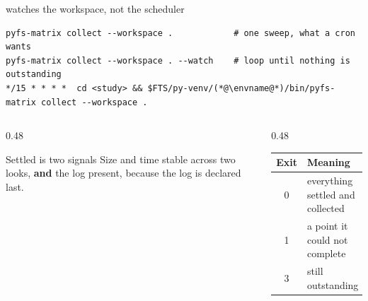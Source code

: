 \begin{frame}[fragile]{ watches the workspace, not the scheduler}
\begin{lstlisting}[style=ftsbase]
pyfs-matrix collect --workspace .            # one sweep, what a cron wants
pyfs-matrix collect --workspace . --watch    # loop until nothing is outstanding
*/15 * * * *  cd <study> && $FTS/py-venv/(*@\envname@*)/bin/pyfs-matrix collect --workspace .
\end{lstlisting}
\begin{columns}[T]
\begin{column}{0.48\textwidth}
\begin{block}{Settled is two signals}
\small Size and time stable across two looks, \textbf{and} the log present,
because the log is declared last.
\end{block}
\end{column}
\begin{column}{0.48\textwidth}
{\ftstablesize
\begin{tabular}{@{}cl@{}}
\toprule
\textbf{Exit} & \textbf{Meaning} \\
\midrule
0 & everything settled and collected \\
1 & a point it could not complete \\
3 & still outstanding \\
\bottomrule
\end{tabular}}
\end{column}
\end{columns}
\end{frame}

